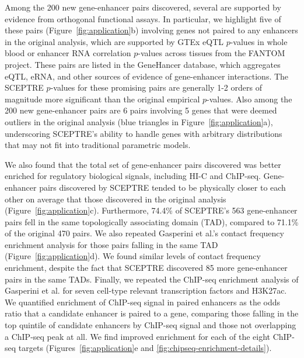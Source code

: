 \documentclass{nature}
\begin{document}
Among the 200 new gene-enhancer pairs discovered, several are supported by evidence from orthogonal functional assays. In particular, we highlight five of these pairs (Figure~\ref{fig:application}b) involving genes not paired to any enhancers in the original analysis, which are supported by GTEx\cite{GTExPilot} eQTL $p$-values in whole blood or enhancer RNA correlation $p$-values across tissues from the FANTOM project\cite{Andersson2014}. These pairs are listed in the GeneHancer database\cite{Fishilevich2017}, which aggregates eQTL, eRNA, and other sources of evidence of gene-enhancer interactions. The SCEPTRE $p$-values for these promising pairs are generally 1-2 orders of magnitude more significant than the original empirical $p$-values. Also among the 200 new gene-enhancer pairs are 6 pairs involving 5 genes that were deemed outliers in the original analysis (blue triangles in Figure~\ref{fig:application}a), underscoring SCEPTRE's ability to handle genes with arbitrary distributions that may not fit into traditional parametric models. 

We also found that the total set of gene-enhancer pairs discovered was better enriched for regulatory biological signals, including HI-C and ChIP-seq. Gene-enhancer pairs discovered by SCEPTRE tended to be physically closer to each other on average that those discovered in the original analysis (Figure~\ref{fig:application}c). Furthermore, 74.4\% of SCEPTRE's 563 gene-enhancer pairs fell in the same topologically associating domain (TAD), compared to 71.1\% of the original 470 pairs. We also repeated Gasperini et al.'s contact frequency enrichment analysis for those pairs falling in the same TAD (Figure~\ref{fig:application}d). We found similar levels of contact frequency enrichment, despite the fact that SCEPTRE discovered 85 more gene-enhancer pairs in the same TADs. Finally, we repeated the ChIP-seq enrichment analysis of Gasperini et al. for seven cell-type relevant transcription factors and H3K27ac. We quantified enrichment of ChIP-seq signal in paired enhancers as the odds ratio that a candidate enhancer is paired to a gene, comparing those falling in the top quintile of candidate enhancers by ChIP-seq signal and those not overlapping a ChIP-seq peak at all. We find improved enrichment for each of the eight ChIP-seq targets (Figures~\ref{fig:application}e and \ref{fig:chipseq-enrichment-details}).
\end{document}

